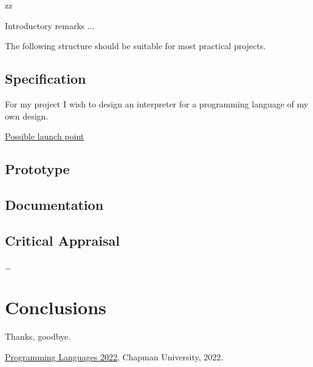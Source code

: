 zz\documentclass{article}
\theoremstyle{theorem}
\theoremstyle{definition}
\theoremstyle{remark}
\begin{document}
Introductory remarks ...

The following structure should be suitable for most practical projects. 

\subsection{Specification}

For my project I wish to design an interpreter for a programming language of my own design.



\href{https://www.stephendiehl.com/llvm/}{Possible launch point}

\subsection{Prototype}
\subsection{Documentation}
\subsection{Critical Appraisal}

\ldots

\section{Conclusions}\label{conclusions}


Thanks, goodbye.

\begin{thebibliography}{99}
 \href{https://github.com/alexhkurz/programming-languages-2022/blob/main/README.md}{Programming Languages 2022}, Chapman University, 2022.
\end{thebibliography}

\end{document}
